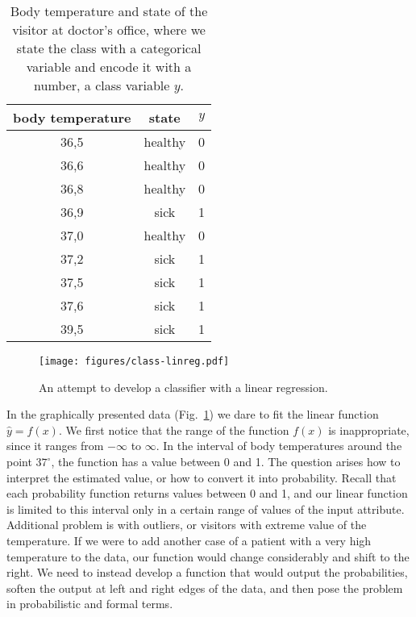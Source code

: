 \begin{refsection}
\begin{table}[htbp]
\caption{Body temperature and state of the visitor at doctor's office, where we state the class with a categorical variable and encode it with a number, a class variable $y$.}
\label{tab:temperature}
\begin{center}
\begin{tabular}{ccc}
\toprule
body temperature & state & $y$ \\
\midrule
36,5 & healthy & 0 \\
36,6 & healthy & 0 \\
36,8 & healthy & 0 \\
36,9 & sick & 1 \\
37,0 & healthy & 0 \\
37,2 & sick & 1 \\
37,5 & sick & 1 \\
37,6 & sick & 1 \\
39,5 & sick & 1 \\
\bottomrule
\end{tabular}
\end{center}
\end{table}

\begin{figure}[htbp]
\begin{center}
\texttt{[image: figures/class-linreg.pdf]}
\caption{An attempt to develop a classifier with a linear regression.}
\label{f:class-linreg}
\end{center}
\end{figure}

In the graphically presented data (Fig.~\ref{f:class-linreg}) we dare to fit the linear function $\hat{y}=f(x)$. We first notice that the range of the function $f(x)$ is inappropriate, since it ranges from $-\infty$ to $\infty$. In the interval of body temperatures around the point $37^{\circ}$, the function has a value between 0 and 1. The question arises how to interpret the estimated value, or how to convert it into probability. Recall that each probability function returns values between 0 and 1, and our linear function is limited to this interval only in a certain range of values of the input attribute. Additional problem is with outliers, or visitors with extreme value of the temperature. If we were to add another case of a patient with a very high temperature to the data, our function would change considerably and shift to the right. We need to instead develop a function that would output the probabilities, soften the output at left and right edges of the data, and then pose the problem in probabilistic and formal terms.


\end{refsection}
